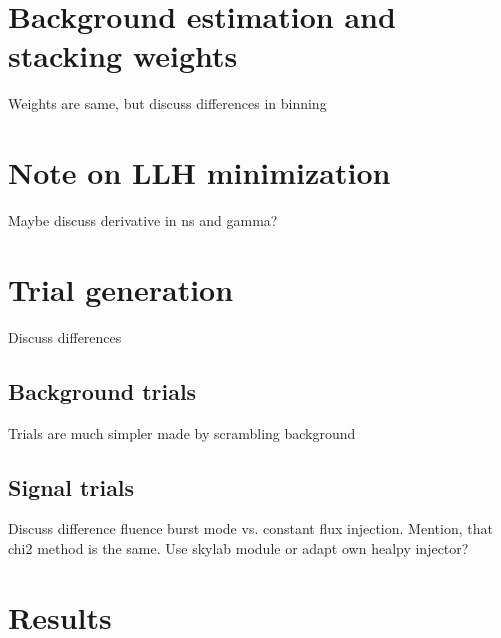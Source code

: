 \section{Background estimation and stacking weights}
Weights are same, but discuss differences in binning


\section{Note on LLH minimization}
Maybe discuss derivative in ns and gamma?


\section{Trial generation}
Discuss differences

\subsection*{Background trials}
Trials are much simpler made by scrambling background

\subsection*{Signal trials}
Discuss difference fluence burst mode vs. constant flux injection.
Mention, that chi2 method is the same.
Use skylab module or adapt own healpy injector?


\section{Results}

